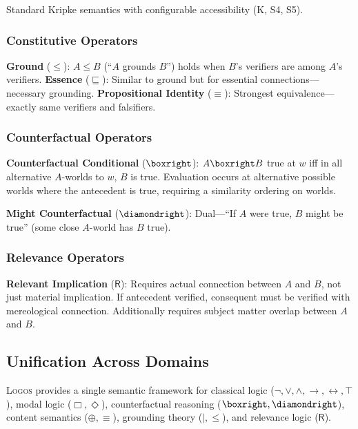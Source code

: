 \documentclass[pdflatex,sn-mathphys-num]{sn-jnl}
\newcommand{\nec}{\Box}                     %
\newcommand{\poss}{\Diamond}                %
\newcommand{\imp}{\to}                      %
\newcommand{\lneg}{\neg}                    %
\newcommand{\ground}{\leq}                  %
\newcommand{\essence}{\sqsubseteq}          %
\newcommand{\propident}{\equiv}             %
\newcommand{\relimpl}{\mathsf{R}}           %
\newcommand{\theorylogos}{\textsc{Logos}}
\theoremstyle{thmstyleone}
\theoremstyle{thmstyletwo}
\theoremstyle{thmstylethree}
\begin{document}
Standard Kripke semantics with configurable accessibility (K, S4, S5).

\subsubsection{Constitutive Operators}

\textbf{Ground} ($\ground$): $A \ground B$ (``$A$ grounds $B$'') holds when $B$'s verifiers are among $A$'s verifiers.
\textbf{Essence} ($\essence$): Similar to ground but for essential connections---necessary grounding.
\textbf{Propositional Identity} ($\propident$): Strongest equivalence---exactly same verifiers and falsifiers.

\subsubsection{Counterfactual Operators}

\textbf{Counterfactual Conditional} ($\boxright$): $A \boxright B$ true at $w$ iff in all alternative $A$-worlds to $w$, $B$ is true.
Evaluation occurs at alternative possible worlds where the antecedent is true, requiring a similarity ordering on worlds.

\textbf{Might Counterfactual} ($\diamondright$): Dual---``If $A$ were true, $B$ might be true'' (some close $A$-world has $B$ true).

\subsubsection{Relevance Operators}

\textbf{Relevant Implication} ($\relimpl$): Requires actual connection between $A$ and $B$, not just material implication.
If antecedent verified, consequent must be verified with mereological connection.
Additionally requires subject matter overlap between $A$ and $B$.

\subsection{Unification Across Domains}\label{sec:unification}

\theorylogos{} provides a single semantic framework for classical logic ($\lneg, \lor, \land, \imp, \leftrightarrow, \top$), modal logic ($\nec, \poss$), counterfactual reasoning ($\boxright, \diamondright$), content semantics ($\oplus, \propident$), grounding theory ($\mathbin{|}, \ground$), and relevance logic ($\relimpl$).
\end{document}
